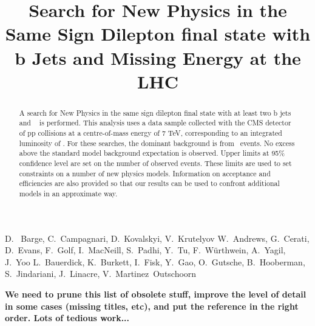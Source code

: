 \documentclass{cmspaper}
\begin{document}
%
\begin{titlepage}
\title{Search for New Physics in the Same Sign Dilepton final state with b Jets and Missing Energy at the LHC}

  \begin{Authlist}
    D.~ Barge, C.~Campagnari, D.~Kovalskyi, V.~Krutelyov
    W.~Andrews, G.~Cerati, D.~Evans, F.~Golf, I.~MacNeill, S.~Padhi, Y.~Tu, F.~W\"urthwein, A.~Yagil, J.~Yoo
    L.~Bauerdick, K.~Burkett, I.~Fisk, Y.~Gao, O.~Gutsche, B.~Hooberman, S.~Jindariani, J.~Linacre,
    V.~Martinez~Outschoorn
  \end{Authlist}

\begin{abstract}
A search for New Physics in the same sign dilepton final state with at least two b jets 
and \met~ is performed. 
This analysis uses a data sample collected with the CMS detector
of pp collisions at a centre-of-mass energy of 7 TeV, corresponding to an integrated
luminosity of \intLumi. 
For these searches, the dominant background is from \ttbar\ events. 
No excess above the standard model background expectation is observed.
Upper limits at 95\% confidence level are set on the number of observed events.
These limits are used to set constraints on a number of new physics models.
Information on acceptance and efficiencies are also provided so that our 
results can be used to confront additional models in an approximate way.
\end{abstract}
\end{titlepage}


%
%











\clearpage
{\bf We need to prune this list of obsolete stuff, improve the level
of detail in some cases (missing titles, etc), 
and put the reference in the right order.  Lots of tedious work...}


\clearpage
\appendix

\end{document}
